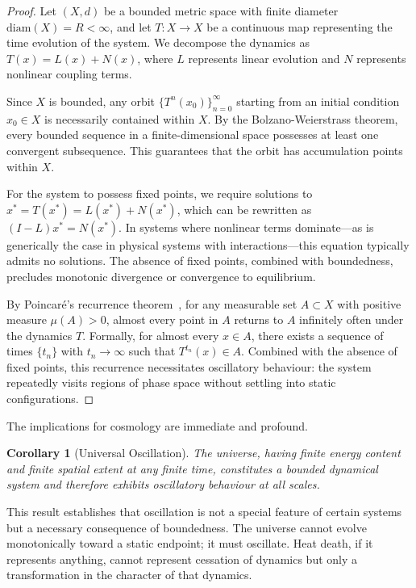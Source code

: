\documentclass[12pt,a4paper]{article}
\newtheorem{corollary}[theorem]{Corollary}
\theoremstyle{definition}
\theoremstyle{remark}
\begin{document}
\begin{proof}
Let $(X, d)$ be a bounded metric space with finite diameter $\text{diam}(X) = R < \infty$, and let $T: X \to X$ be a continuous map representing the time evolution of the system. We decompose the dynamics as $T(x) = L(x) + N(x)$, where $L$ represents linear evolution and $N$ represents nonlinear coupling terms.

Since $X$ is bounded, any orbit $\{T^n(x_0)\}_{n=0}^{\infty}$ starting from an initial condition $x_0 \in X$ is necessarily contained within $X$. By the Bolzano-Weierstrass theorem, every bounded sequence in a finite-dimensional space possesses at least one convergent subsequence. This guarantees that the orbit has accumulation points within $X$.

For the system to possess fixed points, we require solutions to $x^* = T(x^*) = L(x^*) + N(x^*)$, which can be rewritten as $(I - L)x^* = N(x^*)$. In systems where nonlinear terms dominate—as is generically the case in physical systems with interactions—this equation typically admits no solutions. The absence of fixed points, combined with boundedness, precludes monotonic divergence or convergence to equilibrium.

By Poincaré's recurrence theorem~\citep{poincare1890probleme}, for any measurable set $A \subset X$ with positive measure $\mu(A) > 0$, almost every point in $A$ returns to $A$ infinitely often under the dynamics $T$. Formally, for almost every $x \in A$, there exists a sequence of times $\{t_n\}$ with $t_n \to \infty$ such that $T^{t_n}(x) \in A$. Combined with the absence of fixed points, this recurrence necessitates oscillatory behaviour: the system repeatedly visits regions of phase space without settling into static configurations.
\end{proof}

The implications for cosmology are immediate and profound.

\begin{corollary}[Universal Oscillation]
\label{cor:universal_oscillation}
The universe, having finite energy content and finite spatial extent at any finite time, constitutes a bounded dynamical system and therefore exhibits oscillatory behaviour at all scales.
\end{corollary}

This result establishes that oscillation is not a special feature of certain systems but a necessary consequence of boundedness. The universe cannot evolve monotonically toward a static endpoint; it must oscillate. Heat death, if it represents anything, cannot represent cessation of dynamics but only a transformation in the character of that dynamics.
\end{document}
